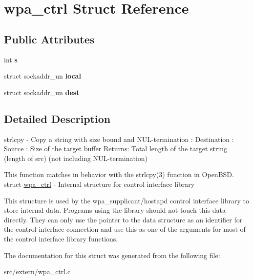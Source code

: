\hypertarget{structwpa__ctrl}{\section{wpa\+\_\+ctrl Struct Reference}
\label{structwpa__ctrl}
}
\subsection*{Public Attributes}
\begin{DoxyCompactItemize}
\item 
\hypertarget{structwpa__ctrl_ac5d2fbfbd7247dcdbd6b271419465ee8}{int {\bfseries s}}\label{structwpa__ctrl_ac5d2fbfbd7247dcdbd6b271419465ee8}

\item 
\hypertarget{structwpa__ctrl_ab91fe974613c7fab068f3751cfcb094f}{struct sockaddr\+\_\+un {\bfseries local}}\label{structwpa__ctrl_ab91fe974613c7fab068f3751cfcb094f}

\item 
\hypertarget{structwpa__ctrl_a8817e5e94060f2ee19889f7fdafa8273}{struct sockaddr\+\_\+un {\bfseries dest}}\label{structwpa__ctrl_a8817e5e94060f2ee19889f7fdafa8273}

\end{DoxyCompactItemize}


\subsection{Detailed Description}
strlcpy -\/ Copy a string with size bound and N\+U\+L-\/termination \+: Destination \+: Source \+: Size of the target buffer Returns\+: Total length of the target string (length of src) (not including N\+U\+L-\/termination)

This function matches in behavior with the strlcpy(3) function in Open\+B\+S\+D. struct \hyperlink{structwpa__ctrl}{wpa\+\_\+ctrl} -\/ Internal structure for control interface library

This structure is used by the wpa\+\_\+supplicant/hostapd control interface library to store internal data. Programs using the library should not touch this data directly. They can only use the pointer to the data structure as an identifier for the control interface connection and use this as one of the arguments for most of the control interface library functions. 

The documentation for this struct was generated from the following file\+:\begin{DoxyCompactItemize}
\item 
src/extern/wpa\+\_\+ctrl.\+c\end{DoxyCompactItemize}
